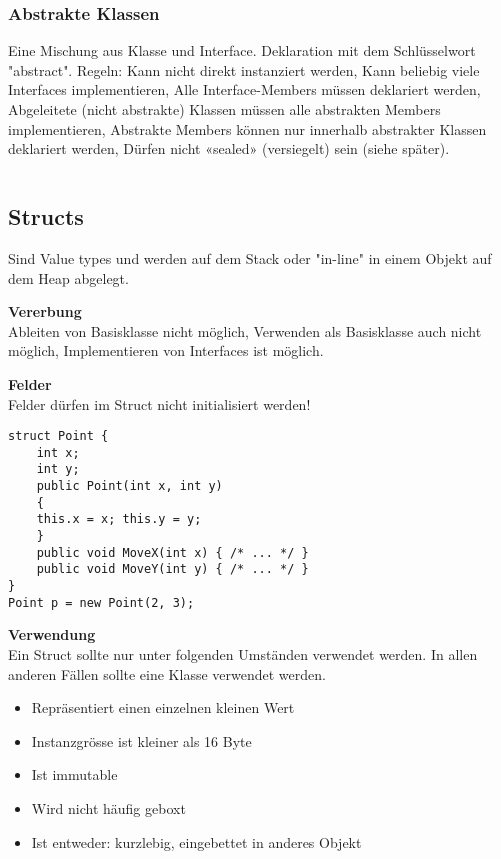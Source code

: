 \subsubsection{Abstrakte Klassen}
Eine Mischung aus Klasse und Interface. Deklaration mit dem Schlüsselwort "abstract". Regeln: Kann nicht direkt instanziert werden, Kann beliebig viele Interfaces implementieren, Alle Interface-Members müssen deklariert werden, Abgeleitete (nicht abstrakte) Klassen müssen alle abstrakten Members implementieren, Abstrakte Members können nur innerhalb abstrakter Klassen deklariert werden, Dürfen nicht «sealed» (versiegelt) sein (siehe später).

\begin{lstlisting}

\end{lstlisting}

\subsection{Structs}
Sind Value types und werden auf dem Stack oder "in-line" in einem Objekt auf dem Heap abgelegt.

\textbf{Vererbung} \\
Ableiten von Basisklasse nicht möglich, Verwenden als Basisklasse auch nicht möglich, Implementieren von Interfaces ist möglich.

\textbf{Felder} \\
Felder dürfen im Struct nicht initialisiert werden!

\begin{lstlisting}
struct Point {
	int x;
	int y;
	public Point(int x, int y)
	{
	this.x = x; this.y = y; 
	} 
	public void MoveX(int x) { /* ... */ } 
	public void MoveY(int y) { /* ... */ }
}
Point p = new Point(2, 3); 
\end{lstlisting}

\textbf{Verwendung} \\
Ein Struct sollte nur unter folgenden Umständen verwendet werden. In allen anderen Fällen sollte eine Klasse verwendet werden.
\begin{itemize}
  \itemsep -0.5em 
  \item Repräsentiert einen einzelnen kleinen Wert
  \item Instanzgrösse ist kleiner als 16 Byte
  \item Ist immutable
  \item Wird nicht häufig geboxt
  \item Ist entweder: kurzlebig, eingebettet in anderes Objekt
\end{itemize}

